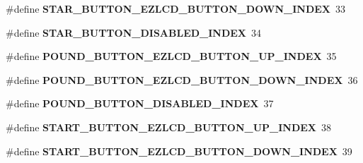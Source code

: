 \begin{DoxyCompactItemize}
\item 
\hypertarget{group__ez_l_c_d__103__user__config_ga5df18f391016f575b107773ea600e4f2}{\#define {\bfseries S\-T\-A\-R\-\_\-\-B\-U\-T\-T\-O\-N\-\_\-\-E\-Z\-L\-C\-D\-\_\-\-B\-U\-T\-T\-O\-N\-\_\-\-D\-O\-W\-N\-\_\-\-I\-N\-D\-E\-X}~33}\label{group__ez_l_c_d__103__user__config_ga5df18f391016f575b107773ea600e4f2}

\item 
\hypertarget{group__ez_l_c_d__103__user__config_ga25c81284d2da2f7bea44d07a97065f7d}{\#define {\bfseries S\-T\-A\-R\-\_\-\-B\-U\-T\-T\-O\-N\-\_\-\-D\-I\-S\-A\-B\-L\-E\-D\-\_\-\-I\-N\-D\-E\-X}~34}\label{group__ez_l_c_d__103__user__config_ga25c81284d2da2f7bea44d07a97065f7d}

\item 
\hypertarget{group__ez_l_c_d__103__user__config_ga95e2d379432be50f690bbac37bccc343}{\#define {\bfseries P\-O\-U\-N\-D\-\_\-\-B\-U\-T\-T\-O\-N\-\_\-\-E\-Z\-L\-C\-D\-\_\-\-B\-U\-T\-T\-O\-N\-\_\-\-U\-P\-\_\-\-I\-N\-D\-E\-X}~35}\label{group__ez_l_c_d__103__user__config_ga95e2d379432be50f690bbac37bccc343}

\item 
\hypertarget{group__ez_l_c_d__103__user__config_gac2d996ac655520d80406c2bfba643726}{\#define {\bfseries P\-O\-U\-N\-D\-\_\-\-B\-U\-T\-T\-O\-N\-\_\-\-E\-Z\-L\-C\-D\-\_\-\-B\-U\-T\-T\-O\-N\-\_\-\-D\-O\-W\-N\-\_\-\-I\-N\-D\-E\-X}~36}\label{group__ez_l_c_d__103__user__config_gac2d996ac655520d80406c2bfba643726}

\item 
\hypertarget{group__ez_l_c_d__103__user__config_ga2deec7df7b09f1cf613981c6e79b064f}{\#define {\bfseries P\-O\-U\-N\-D\-\_\-\-B\-U\-T\-T\-O\-N\-\_\-\-D\-I\-S\-A\-B\-L\-E\-D\-\_\-\-I\-N\-D\-E\-X}~37}\label{group__ez_l_c_d__103__user__config_ga2deec7df7b09f1cf613981c6e79b064f}

\item 
\hypertarget{group__ez_l_c_d__103__user__config_gaefbc0da9d6cb88f7cad3b258ec6c411c}{\#define {\bfseries S\-T\-A\-R\-T\-\_\-\-B\-U\-T\-T\-O\-N\-\_\-\-E\-Z\-L\-C\-D\-\_\-\-B\-U\-T\-T\-O\-N\-\_\-\-U\-P\-\_\-\-I\-N\-D\-E\-X}~38}\label{group__ez_l_c_d__103__user__config_gaefbc0da9d6cb88f7cad3b258ec6c411c}

\item 
\hypertarget{group__ez_l_c_d__103__user__config_ga1f51c8565ad21f1b357414368b2cdf74}{\#define {\bfseries S\-T\-A\-R\-T\-\_\-\-B\-U\-T\-T\-O\-N\-\_\-\-E\-Z\-L\-C\-D\-\_\-\-B\-U\-T\-T\-O\-N\-\_\-\-D\-O\-W\-N\-\_\-\-I\-N\-D\-E\-X}~39}\label{group__ez_l_c_d__103__user__config_ga1f51c8565ad21f1b357414368b2cdf74}


\end{DoxyCompactItemize}
